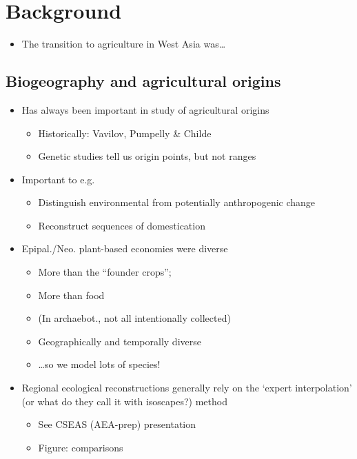 \documentclass[
  authoryear,
  preprint]{elsarticle}
\providecommand{\tightlist}{%
  \setlength{\itemsep}{0pt}\setlength{\parskip}{0pt}}\usepackage{longtable,booktabs,array}
\begin{document}
\section{Background}\label{background}

\begin{itemize}
\tightlist
\item
  The transition to agriculture in West Asia was\ldots{}
\end{itemize}

\subsection{Biogeography and agricultural
origins}\label{biogeography-and-agricultural-origins}

\begin{itemize}
\tightlist
\item
  Has always been important in study of agricultural origins

  \begin{itemize}
  \tightlist
  \item
    Historically: Vavilov, Pumpelly \& Childe
  \item
    Genetic studies tell us origin points, but not ranges
  \end{itemize}
\item
  Important to e.g.

  \begin{itemize}
  \tightlist
  \item
    Distinguish environmental from potentially anthropogenic change
    \citep{MartinEtAl2016, MartinEtAl2025}
  \item
    Reconstruct sequences of domestication \citep{YeomansEtAl2017}
  \end{itemize}
\item
  Epipal./Neo. plant-based economies were diverse

  \begin{itemize}
  \tightlist
  \item
    More than the ``founder crops'';
  \item
    More than food
  \item
    (In archaebot., not all intentionally collected)
  \item
    Geographically and temporally diverse
  \item
    \ldots so we model lots of species!
  \end{itemize}
\item
  Regional ecological reconstructions generally rely on the `expert
  interpolation' (or what do they call it with isoscapes?) method

  \begin{itemize}
  \tightlist
  \item
    See CSEAS (AEA-prep) presentation
  \item
    Figure: comparisons
  \end{itemize}
\end{itemize}
\end{document}
